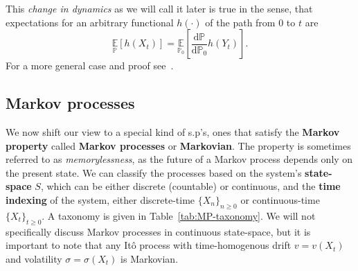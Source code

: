 \noindent
This \emph{change in dynamics} as we will call it later is true in the sense, that expectations for an arbitrary functional $h(\cdot)$ of the path from $0$ to $t$ are
\begin{equation}
	\label{eq:girsanov_consequence}
	\underset{\mathbb{P}}{\mathbb{E}}\left[h(X_t)\right] = \underset{\mathbb{P}_0}{\mathbb{E}}\left[\frac{\mathrm{d} \mathbb{P}}{\mathrm{d} \mathbb{P}_0} h(Y_t)\right]. 
\end{equation}
For a more general case and proof see~\cite{sarkka2019applied}.

\subsection{Markov processes}
We now shift our view to a special kind of s.p's, ones that satisfy the \textbf{Markov property} called \textbf{Markov processes} or \textbf{Markovian}. The property is sometimes referred to as \emph{memorylessness}, as the future of a Markov process depends only on the present state. We can classify the processes based on the system's \textbf{state-space} $S$, which can be either discrete (countable) or continuous, and the \textbf{time indexing} of the system, either discrete-time $\{X_n\}_{n \geq 0}$ or continuous-time $\{X_t\}_{t \geq 0}$. A taxonomy is given in Table~\ref{tab:MP-taxonomy}. We will not specifically discuss Markov processes in continuous state-space, but it is important to note that any It\^ o process with time-homogenous drift $v = v(X_t)$ and volatility $\sigma = \sigma(X_t)$ is Markovian.

